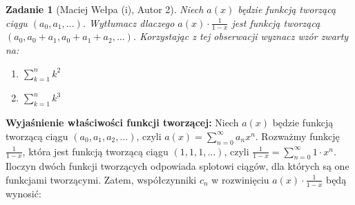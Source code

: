 \documentclass{mwart}
\newtheorem{zad}{Zadanie}[section]
\begin{document}
\begin{zad}[Maciej Wełpa (i), Autor 2]
    Niech $a(x)$ będzie funkcją tworzącą ciągu $(a_0,a_1,\dots)$. Wytłumacz dlaczego $a(x) \cdot \frac{1}{1-x}$ jest funkcją tworzącą $(a_0,a_0+a_1,a_0+a_1+a_2,\dots)$. Korzystając z tej obserwacji wyznacz wzór zwarty na:
    \begin{enumerate}
        \item $\sum_{k=1}^{n} k^2$
        \item $\sum_{k=1}^{n} k^3$
    \end{enumerate}
\end{zad}
\begin{mdframed}
    \textbf{Wyjaśnienie właściwości funkcji tworzącej:} \newline
    Niech $a(x)$ będzie funkcją tworzącą ciągu $(a_0, a_1, a_2, \ldots)$, czyli $a(x) = \sum_{n=0}^{\infty} a_n x^n$.
    Rozważmy funkcję $\frac{1}{1-x}$, która jest funkcją tworzącą ciągu $(1, 1, 1, \ldots)$, czyli $\frac{1}{1-x} = \sum_{n=0}^{\infty} 1 \cdot x^n$.
    Iloczyn dwóch funkcji tworzących odpowiada splotowi ciągów, dla których są one funkcjami tworzącymi. 
    Zatem, współczynniki $c_n$ w rozwinięciu $a(x) \cdot \frac{1}{1-x}$ będą wynosić:
    

\end{mdframed}
\end{document}
